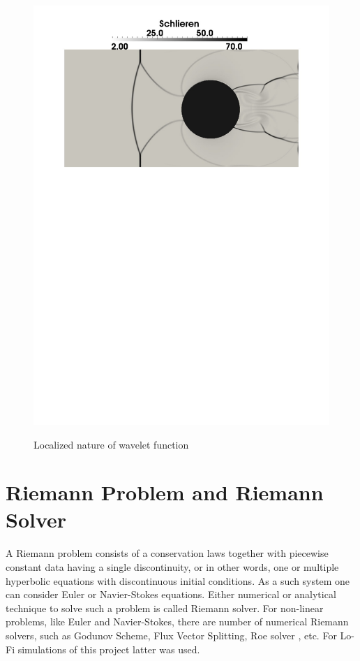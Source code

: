 \begin{figure}[h!]
\begin{minipage}{0.5\linewidth}
\includegraphics[scale=0.4]{fig/visc_sch.pdf}\\
\end{minipage}
\caption{Localized nature of wavelet function} \label{fig:visc}
\end{figure}

\section{Riemann Problem and Riemann Solver}
A Riemann problem consists of a conservation laws together with piecewise constant data having a single discontinuity, or in other words, one or multiple hyperbolic equations with discontinuous initial conditions. As a such system one can consider Euler or Navier-Stokes equations. Either numerical or analytical technique to solve such a problem is called Riemann solver. For non-linear problems, like Euler and Navier-Stokes, there are number of numerical Riemann solvers, such as Godunov Scheme, Flux Vector Splitting, Roe solver \cite{book:Toro}, etc. For Lo-Fi simulations of this project latter was used.

